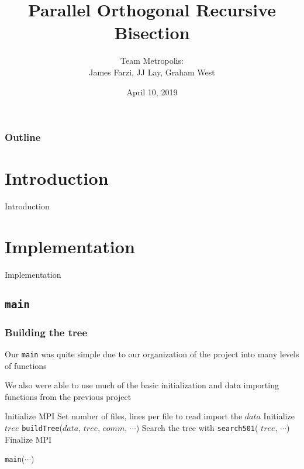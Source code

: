 \documentclass{beamer}
\title[Capstone]{Parallel Orthogonal Recursive Bisection}
\author{Team Metropolis:\\
	James Farzi, JJ Lay, Graham West}
\date{April 10, 2019}
\begin{document}
\frame{\titlepage}

\begin{frame}	
	\frametitle{Outline}
	\tableofcontents
\end{frame}


\section{Introduction}

\begin{frame}	
	\begin{Huge}
		\begin{center}
			Introduction
		\end{center}
	\end{Huge}
\end{frame}


\section{Implementation}

\begin{frame}	
	\begin{Huge}
		\begin{center}
			Implementation
		\end{center}
	\end{Huge}
\end{frame}


\subsection{\texttt{main}}

\begin{frame}
	\frametitle{Building the tree}
	
	Our \texttt{main} was quite simple due to our organization of the project into many levels of functions
	
	\vspace{10pt}
	
	We also were able to use much of the basic initialization and data importing functions from the previous project
	
	\vspace{10pt}
	
	\begin{algorithm}[H]
		\begin{algorithmic}[1]
			\STATE Initialize MPI
			\STATE Set number of files, lines per file to read
			\STATE import the $data$
			\STATE Initialize $tree$
			\STATE \texttt{buildTree}($data$, $tree$, $comm$, $\cdots$)
			\STATE Search the tree with \texttt{search501}( $tree$, $\cdots$)
			\STATE Finalize MPI
		\end{algorithmic}
	\caption{\texttt{main}($\cdots$)}
	\end{algorithm}
		
\end{frame}
\end{document}
